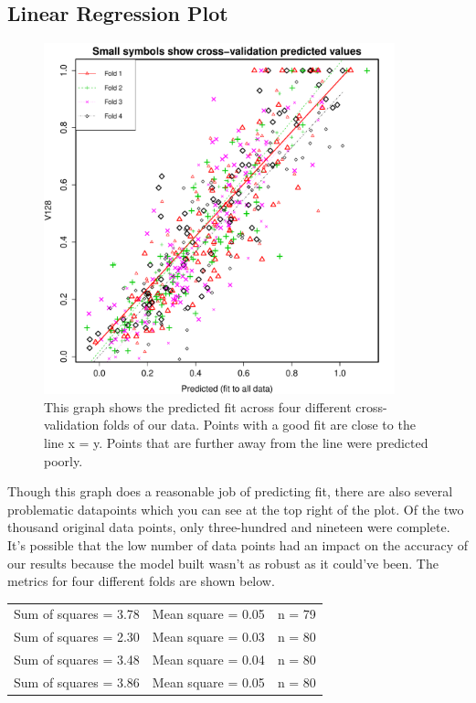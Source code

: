 \documentclass{article}
\begin{document}
\subsection{Linear Regression Plot}
\begin{figure}[H]
\centering
\includegraphics[width=4in]{part1a.pdf} \caption{This graph shows the
predicted fit across four different cross-validation folds of our data. Points
with a good fit are close to the line x = y. Points that are further away from
the line were predicted poorly.}\label{fig_container} 
\end{figure}

Though this graph does a reasonable job of predicting fit, there are also
several problematic datapoints which you can see at the top right of the plot.
Of the two thousand original data points, only three-hundred and nineteen were
complete. It's possible that the low number of data points had an impact on the
accuracy of our results because the model built wasn't as robust as it could've
been. The metrics for four different folds are shown below.\\ 

\noindent
\begin{tabular}{l c r}
  Sum of squares = 3.78 & Mean square = 0.05 & n = 79\\ 
  Sum of squares = 2.30 & Mean square = 0.03 & n = 80\\
  Sum of squares = 3.48 & Mean square = 0.04 & n = 80\\ 
  Sum of squares = 3.86 & Mean square = 0.05 & n = 80\\ 
\end{tabular}\\
\end{document}
